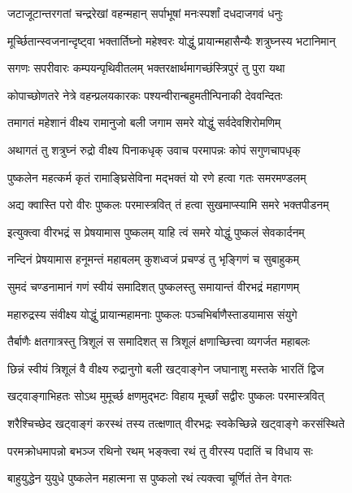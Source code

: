 \twolineshloka
{जटाजूटान्तरगतां चन्द्ररेखां वहन्महान्}
{सर्पाभूषां मनःस्पर्शां दधदाजगवं धनुः}%

\twolineshloka
{मूर्च्छितान्स्वजनान्दृष्ट्वा भक्तार्तिघ्नो महेश्वरः}
{योद्धुं प्रायान्महासैन्यैः शत्रुघ्नस्य भटानिमान्}%

\twolineshloka
{सगणः सपरीवारः कम्पयन्पृथिवीतलम्}
{भक्तरक्षार्थमागच्छंस्त्रिपुरं तु पुरा यथा}%

\twolineshloka
{कोपाच्छोणतरे नेत्रे वहन्प्रलयकारकः}
{पश्यन्वीरान्बहुमतीन्पिनाकी देववन्दितः}%

\twolineshloka
{तमागतं महेशानं वीक्ष्य रामानुजो बली}
{जगाम समरे योद्धुं सर्वदेवशिरोमणिम्}%

\twolineshloka
{अथागतं तु शत्रुघ्नं रुद्रो वीक्ष्य पिनाकधृक्}
{उवाच परमापन्नः कोपं सगुणचापधृक्}%

\twolineshloka
{पुष्कलेन महत्कर्म कृतं रामाङ्घ्रिसेविना}
{मद्भक्तं यो रणे हत्वा गतः समरमण्डलम्}%

\twolineshloka
{अद्य क्वास्ति परो वीरः पुष्कलः परमास्त्रवित्}
{तं हत्वा सुखमाप्स्यामि समरे भक्तपीडनम्}%


\twolineshloka
{इत्युक्त्वा वीरभद्रं स प्रेषयामास पुष्कलम्}
{याहि त्वं समरे योद्धुं पुष्कलं सेवकार्दनम्}%

\twolineshloka
{नन्दिनं प्रेषयामास हनूमन्तं महाबलम्}
{कुशध्वजं प्रचण्डं तु भृङ्गिणं च सुबाहुकम्}%

\twolineshloka
{सुमदं चण्डनामानं गणं स्वीयं समादिशत्}
{पुष्कलस्तु समायान्तं वीरभद्रं महागणम्}%

\twolineshloka
{महारुद्रस्य संवीक्ष्य योद्धुं प्रायान्महामनाः}
{पुष्कलः पञ्चभिर्बाणैस्ताडयामास संयुगे}%

\twolineshloka
{तैर्बाणैः क्षतगात्रस्तु त्रिशूलं स समादिशत्}
{स त्रिशूलं क्षणाच्छित्त्वा व्यगर्जत महाबलः}%

\twolineshloka
{छिन्नं स्वीयं त्रिशूलं वै वीक्ष्य रुद्रानुगो बली}
{खट्वाङ्गेन जघानाशु मस्तके भारतिं द्विज}%

\twolineshloka
{खट्वाङ्गाभिहतः सोऽथ मुमूर्च्छ क्षणमुद्भटः}
{विहाय मूर्च्छां सद्वीरः पुष्कलः परमास्त्रवित्}%

\twolineshloka
{शरैश्चिच्छेद खट्वाङ्गं करस्थं तस्य तत्क्षणात्}
{वीरभद्रः स्वकेच्छिन्ने खट्वाङ्गे करसंस्थिते}%

\twolineshloka
{परमक्रोधमापन्नो बभञ्ज रथिनो रथम्}
{भङ्क्त्वा रथं तु वीरस्य पदातिं च विधाय सः}%

\twolineshloka
{बाहुयुद्धेन युयुधे पुष्कलेन महात्मना}
{स पुष्कलो रथं त्यक्त्वा चूर्णितं तेन वेगतः}%

